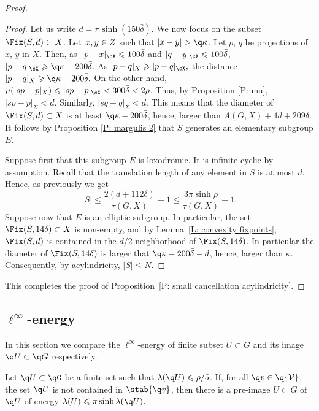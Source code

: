\begin{proof}
\begin{proof}
Let us write $d=\pi \sinh (150\bar \delta)$.
We now focus on the subset $\Fix(S,d) \subset X$.
Let~$x,y \in\nobreak Z$ such that $|x-y|>\q \kappa$.
Let $p$, $q$ be projections of $x$, $y$ in $X$. Then, as~$|p-x|_{\cX}\leqslant 100 \bar \delta$ and $ |q-y|_{\cX} \leqslant 100 \bar \delta$, $|p-q|_{\cX}\geqslant \q \kappa - 200 \bar \delta$. As $|p-q|_X\geqslant |p-q|_{\cX},$
the distance $ |p-q|_X \geqslant\q \kappa - 200 \bar \delta.$
On the other hand, $\mu (|sp-p|_X)\leqslant |sp-p|_{\cX} < 300 \bar \delta <2\rho$. Thus, by Proposition \ref{P: mu}, $ |sp-p|_X< d.$ Similarly, $|sq-q|_X < d$.
This means that the diameter of $\Fix(S,d) \subset X$ is at least $\q\kappa -200 \bar \delta$, hence, larger than $A(G,X) +4d+209\delta$.
It follows by Proposition \ref{P: margulis 2} that $S$ generates an elementary subgroup $E$.

Suppose first that this subgroup $E$ is loxodromic.
It is infinite cyclic by assumption.
Recall that the translation length of any element in $S$ is at most $d$.
Hence, as previously we get
\begin{equation*}
|S|\leqslant \frac {2(d+112\delta)}{\tau(G, X)} +1 \leqslant \frac{3 \pi \sinh\rho}{\tau(G, X)}+1.
\end{equation*}
Suppose now that $E$ is an elliptic subgroup.
In particular, the set $\Fix(S,14\delta) \subset X$ is non-empty, and by Lemma~\ref{L: convexity fixpoints}, $\Fix(S,d)$ is contained in the $d/2$-neighborhood of $\Fix(S, 14\delta)$.
In particular the diameter of $\Fix(S, 14\delta)$ is larger that $\q\kappa -200 \bar\delta-d$, hence, larger than $\kappa$.
Consequently, by acylindricity, $|S| \leq N$.
\end{proof}

This completes the proof of Proposition~\ref{P: small cancellation acylindricity}.
\end{proof}

\subsection{\texorpdfstring{$\ell^{\infty}$-energy}{Energy}}

In this section we compare the $\ell^{\infty}$-energy of finite subset $U\subset G$ and its image $\q U\subset \q G$ respectively.

\begin{prop}\label{P: energy lift}
Let $\q U \subset \qG$ be a finite set such that $\lambda(\q U)\leqslant \rho/5$.
If, for all $\q v\in \q {\mathcal V}$, the set $\q U$ is not contained in $\stab{\q v}$, then there is a pre-image $U\subset G $ of $\q U$ of energy
$\lambda(U) \leqslant \pi \sinh \lambda(\q U).$
\end{prop}

